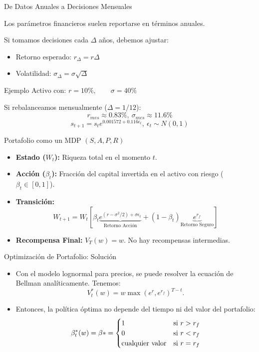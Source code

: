 \documentclass[xcolor=dvipsnames]{beamer}
\begin{document}
\begin{frame}{De Datos Anuales a Decisiones Mensuales}

Los parámetros financieros suelen reportarse en términos anuales.

\vspace{0.2cm}

Si tomamos decisiones cada $\Delta$ años, debemos ajustar:

\begin{itemize}
\item Retorno esperado: $r_{\Delta}=r\Delta$
\item Volatilidad: $\sigma_{\Delta}=\sigma\sqrt{\Delta}$
\end{itemize}

\begin{exampleblock}{Ejemplo}
Activo con: $r=10\%, \qquad \sigma=40\%$

Si rebalanceamos mensualmente ($\Delta=1/12$):
\[
r_{mes}\approx 0.83\%,~\sigma_{mes}\approx 11.6\%
\]
\[ s_{t+1} = s_te^{ 0.001572 +0.116 \epsilon_t},~ \epsilon_t\sim N(0,1) \]

\end{exampleblock}

\end{frame}


\begin{frame}{Portafolio como un MDP $(S, A, P, R)$}
\begin{itemize}
    \item \textbf{Estado ($W_t$):} Riqueza total en el momento $t$.
    \item \textbf{Acci\'on ($\beta_t$):} Fracci\'on del capital invertida en el activo con riesgo ($\beta_t \in [0,1]$).
    \item \textbf{Transici\'on:} 
    \[ W_{t+1} = W_t \left[ \beta_t \underbrace{e^{(r - \sigma^2/2) + \sigma \epsilon_t}}_{\text{Retorno Acci\'on}} + (1 - \beta_t) \underbrace{e^{r_f}}_{\text{Retorno Seguro}} \right] \]
    \item \textbf{Recompensa Final:} $V_T(w) = w$. No hay recompensas intermedias.
\end{itemize}
\end{frame}


\begin{frame}{Optimización de Portafolio: Solución}
\begin{itemize}
\item Con el modelo lognormal para precios, se puede resolver la ecuaci\'on de Bellman anal\'iticamente. Tenemos:
$$
V_t^*(w) = w \max(e^r, e^{r_f})^{T-t}.
$$
\item<4-> Entonces, la política óptima no depende del tiempo ni del valor del portafolio: 
$$
\beta_{t}^*(w) = \beta* = \begin{cases}
1 & {\rm si~} r>r_f \\
0 & {\rm si~} r<r_f \\
{\rm cualquier~valor} &{\rm si~}r=r_f
\end{cases}
$$
\end{itemize}
\end{frame}
\end{document}
